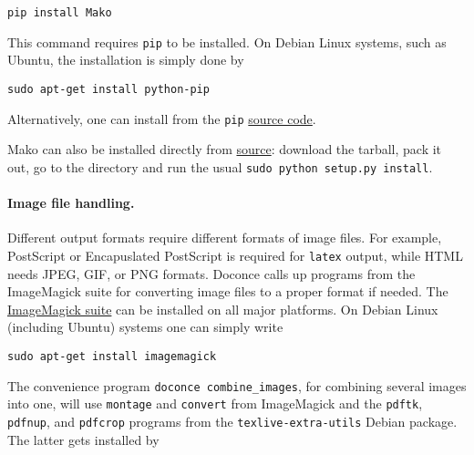 \documentclass[%
oneside,                 %
final,                   %
10pt]{article}
\begin{document}
\vspace{4pt}
\begin{Verbatim}[numbers=none,frame=lines,label=\fbox{{\tiny Terminal}},fontsize=\fontsize{9pt}{9pt},
labelposition=topline,framesep=2.5mm,framerule=0.7pt]
pip install Mako
\end{Verbatim}
This command requires {\fontsize{10pt}{10pt}\Verb!pip!} to be installed. On Debian Linux systems,
such as Ubuntu, the installation is simply done by

\vspace{4pt}
\begin{Verbatim}[numbers=none,frame=lines,label=\fbox{{\tiny Terminal}},fontsize=\fontsize{9pt}{9pt},
labelposition=topline,framesep=2.5mm,framerule=0.7pt]
sudo apt-get install python-pip
\end{Verbatim}
Alternatively, one can install from the {\fontsize{10pt}{10pt}\Verb!pip!} \href{{http://pypi.python.org/pypi/pip}}{source code}.

Mako can also be installed directly from
\href{{http://www.makotemplates.org/download.html}}{source}: download the
tarball, pack it out, go to the directory and run
the usual {\fontsize{10pt}{10pt}\Verb!sudo python setup.py install!}.

\paragraph{Image file handling.}
Different output formats require different formats of image files.
For example, PostScript or Encapuslated PostScript is required for {\fontsize{10pt}{10pt}\Verb!latex!}
output, while HTML needs JPEG, GIF, or PNG formats.
Doconce calls up programs from the ImageMagick suite for converting
image files to a proper format if needed. The \href{{http://www.imagemagick.org/script/index.php}}{ImageMagick suite} can be installed on all major platforms.
On Debian Linux (including Ubuntu) systems one can simply write

\vspace{4pt}
\begin{Verbatim}[numbers=none,frame=lines,label=\fbox{{\tiny Terminal}},fontsize=\fontsize{9pt}{9pt},
labelposition=topline,framesep=2.5mm,framerule=0.7pt]
sudo apt-get install imagemagick
\end{Verbatim}

The convenience program {\fontsize{10pt}{10pt}\Verb!doconce combine_images!}, for combining several
images into one, will use {\fontsize{10pt}{10pt}\Verb!montage!} and {\fontsize{10pt}{10pt}\Verb!convert!} from ImageMagick and
the {\fontsize{10pt}{10pt}\Verb!pdftk!}, {\fontsize{10pt}{10pt}\Verb!pdfnup!}, and {\fontsize{10pt}{10pt}\Verb!pdfcrop!} programs from the {\fontsize{10pt}{10pt}\Verb!texlive-extra-utils!}
Debian package. The latter gets installed by
\end{document}
